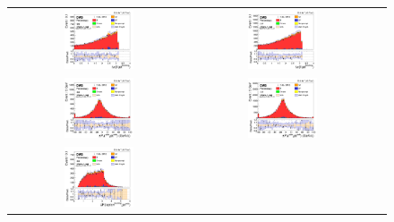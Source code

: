 \begin{figure}[ht]
  \begin{center}
    \begin{tabular}{ccc}
      \includegraphics[width=0.4\textwidth]{figures/tW/fig/MVA_input/ee/H_2j1b_dPhi_ll_j1.png}&
      \includegraphics[width=0.4\textwidth]{figures/tW/fig/MVA_input/mumu/H_2j1b_dPhi_ll_j1.png}\\
      \includegraphics[width=0.4\textwidth]{figures/tW/fig/MVA_input/ee/H_2j1b_dPt_l2_j2.png}&
      \includegraphics[width=0.4\textwidth]{figures/tW/fig/MVA_input/mumu/H_2j1b_dPt_l2_j2.png}\\
      \includegraphics[width=0.4\textwidth]{figures/tW/fig/MVA_input/ee/H_2j1b_dR_l1_j2.png}&

\end{tabular}
\end{center}
\end{figure}

